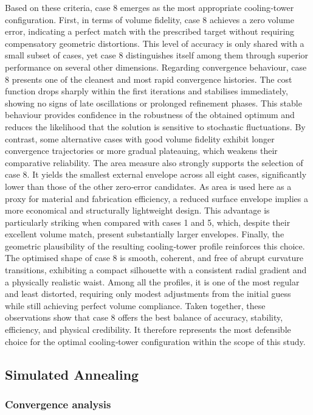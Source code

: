 Based on these criteria, case 8 emerges as the most appropriate cooling‑tower configuration. First, in terms of volume fidelity, case 8 achieves a zero volume error, indicating a perfect match with the prescribed target without requiring compensatory geometric distortions. This level of accuracy is only shared with a small subset of cases, yet case 8 distinguishes itself among them through superior performance on several other dimensions.
Regarding convergence behaviour, case 8 presents one of the cleanest and most rapid convergence histories. The cost function drops sharply within the first iterations and stabilises immediately, showing no signs of late oscillations or prolonged refinement phases. This stable behaviour provides confidence in the robustness of the obtained optimum and reduces the likelihood that the solution is sensitive to stochastic fluctuations. By contrast, some alternative cases with good volume fidelity exhibit longer convergence trajectories or more gradual plateauing, which weakens their comparative reliability.
The area measure also strongly supports the selection of case 8. It yields the smallest external envelope across all eight cases, significantly lower than those of the other zero‑error candidates. As area is used here as a proxy for material and fabrication efficiency, a reduced surface envelope implies a more economical and structurally lightweight design. This advantage is particularly striking when compared with cases 1 and 5, which, despite their excellent volume match, present substantially larger envelopes.
Finally, the geometric plausibility of the resulting cooling‑tower profile reinforces this choice. The optimised shape of  case 8 is smooth, coherent, and free of abrupt curvature transitions, exhibiting a compact silhouette with a consistent radial gradient and a physically realistic waist. Among all the profiles, it is one of the most regular and least distorted, requiring only modest adjustments from the initial guess while still achieving perfect volume compliance.
Taken together, these observations show that case 8 offers the best balance of accuracy, stability, efficiency, and physical credibility. It therefore represents the most defensible choice for the optimal cooling‑tower configuration within the scope of this study.

\subsection{Simulated Annealing}

\subsubsection{Convergence analysis}

